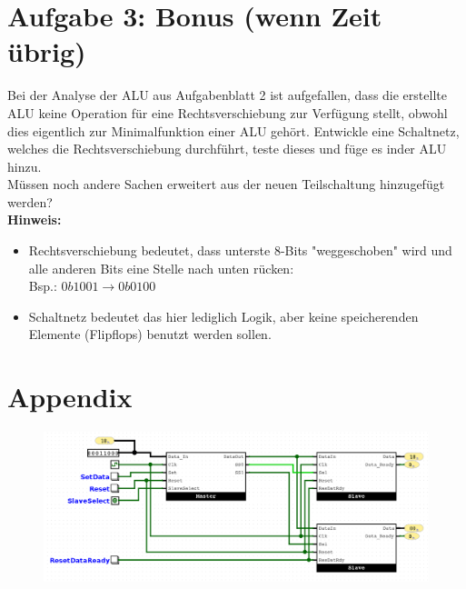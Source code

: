 \documentclass[a4paper]{scrartcl}
\begin{document}
\section*{Aufgabe 3: Bonus (wenn Zeit übrig)}
Bei der Analyse der ALU aus Aufgabenblatt 2 ist aufgefallen, dass die erstellte ALU keine Operation für eine 
Rechtsverschiebung zur Verfügung stellt, obwohl dies eigentlich zur Minimalfunktion einer ALU gehört. Entwickle eine 
Schaltnetz, welches die Rechtsverschiebung durchführt, teste dieses und füge es inder ALU hinzu.\\
Müssen noch andere Sachen erweitert aus der neuen Teilschaltung hinzugefügt werden?
\\

\textbf{Hinweis:} 
\begin{itemize}
  \item Rechtsverschiebung bedeutet, dass unterste 8-Bits "weggeschoben" wird und alle anderen Bits eine Stelle nach unten rücken:\\
  Bsp.: $0b1001 \rightarrow 0b0100$
  \item Schaltnetz bedeutet das hier lediglich Logik, aber keine speicherenden Elemente (Flipflops) benutzt werden sollen.
\end{itemize}

\section*{Appendix}
\begin{figure}[h]
  \centering
  \includegraphics[width=\textwidth]{Assembly.png}
\end{figure}

  
\end{document}
